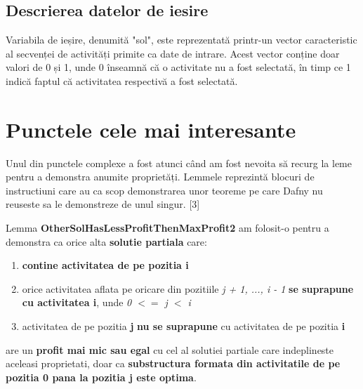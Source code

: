 \subsection{Descrierea datelor de iesire}
Variabila de ieșire, denumită "sol", este reprezentată printr-un vector caracteristic al secvenței de activități primite ca date de intrare. Acest vector conține doar valori de 0 și 1, unde 0 înseamnă că o activitate nu a fost selectată, în timp ce 1 indică faptul că activitatea respectivă a fost selectată.

\section{Punctele cele mai interesante}
Unul din punctele complexe a fost atunci când am fost nevoita să recurg la leme pentru a demonstra anumite proprietăți. Lemmele reprezintă blocuri de instructiuni care au ca scop demonstrarea unor teoreme pe care Dafny nu reuseste sa le demonstreze de unul singur. [3]

Lemma \textbf{OtherSolHasLessProfitThenMaxProfit2} am folosit-o pentru a demonstra ca orice alta \textbf{solutie partiala} care:
\begin{enumerate}
    \item \textbf{contine activitatea de pe pozitia i}
    \item orice activitatea aflata pe oricare din pozitiile \textit{j + 1, ..., i - 1} \textbf{se suprapune cu activitatea i}, unde \textit{0 $<=$ j $<$ i}
    \item activitatea de pe pozitia \textbf{j} \textbf{nu se suprapune} cu activitatea de pe pozitia \textbf{i} 
\end{enumerate}
are un \textbf{profit mai mic sau egal} cu cel al solutiei partiale care indeplineste aceleasi proprietati, doar ca \textbf{substructura formata din activitatile de pe pozitia 0 pana la pozitia j este optima}. 

